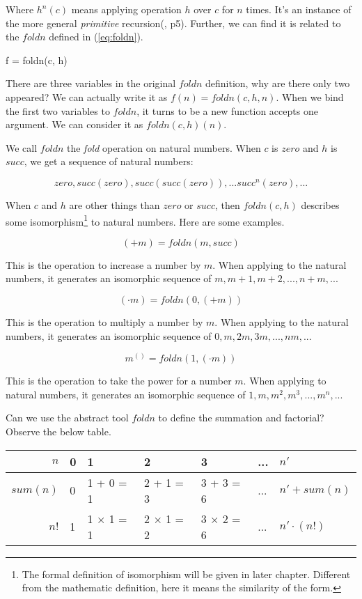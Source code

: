 \documentclass[UTF8]{article}
\begin{document}
\vspace{5mm}

Where $h^n(c)$ means applying operation $h$ over $c$ for $n$ times. It's an instance of the more general {\em primitive} recursion(\cite{Bird97}, p5). Further, we can find it is related to the $foldn$ defined in (\ref{eq:foldn}).

\be
f = foldn(c, h)
\ee

There are three variables in the original $foldn$ definition, why are there only two appeared? We can actually write it as $f(n) = foldn(c, h, n)$. When we bind the first two variables to $foldn$, it turns to be a new function accepts one argument. We can consider it as $foldn(c, h)(n)$.

We call $foldn$ the {\em fold} operation on natural numbers. When $c$ is $zero$ and $h$ is $succ$, we get a sequence of natural numbers:

\[
zero, succ(zero), succ(succ(zero)), ... succ^n(zero), ...
\]

When $c$ and $h$ are other things than $zero$ or $succ$, then $foldn(c, h)$ describes some isomorphism\footnote{The formal definition of isomorphism will be given in later chapter. Different from the mathematic definition, here it means the similarity of the form.} to natural numbers. Here are some examples.

\[
(+ m) = foldn(m, succ)
\]

This is the operation to increase a number by $m$. When applying to the natural numbers, it generates an isomorphic sequence of $m, m + 1, m + 2, ..., n + m, ...$

\[
(\cdot m) = foldn(0, (+ m))
\]

This is the operation to multiply a number by $m$. When applying to the natural numbers, it generates an isomorphic sequence of $0, m, 2m, 3m, ..., nm, ...$

\[
m^{()} = foldn(1, (\cdot m))
\]

This is the operation to take the power for a number $m$. When applying to natural numbers, it generates an isomorphic sequence of $1, m, m^2, m^3, ..., m^n, ...$

Can we use the abstract tool $foldn$ to define the summation and factorial? Observe the below table.

\vspace{5mm}

\begin{tabular}{r|l|l|l|l|l|l}
$n$ & 0 & 1 & 2 & 3 & ... & $n'$ \\
\hline
$sum(n)$ & 0 & 1 + 0 = 1 & 2 + 1 = 3 & 3 + 3 = 6 & ... & $n' + sum(n)$ \\
\hline
$n!$ & 1 & 1 $\times$ 1 = 1 & 2 $\times$ 1 = 2 & 3 $\times$ 2 = 6 & ... & $n' \cdot (n!)$
\end{tabular}
\end{document}
